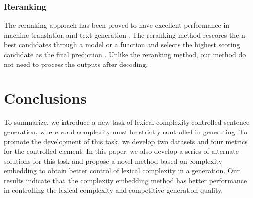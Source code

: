 \documentclass[11pt]{article}
\begin{document}
\subsubsection{Reranking}
The reranking approach has been proved to have excellent performance in machine translation \cite{pandramish2020checkpoint, wang2007reranking} and text generation \cite{ravaut2022summareranker}. The reranking method rescores the n-best candidates through a model or a function and selects the highest scoring candidate as the final prediction \cite{imamura2017ensemble}. Unlike the reranking method, our method do not need to process the outputs after decoding.  

\section{Conclusions}
To summarize, we introduce a new task of lexical complexity controlled sentence generation, where word complexity must be strictly controlled in generating. To promote the development of this task, we develop two datasets and four metrics for the controlled element. In this paper, we also develop a series of alternate solutions for this task and propose a novel method based on complexity embedding to obtain better control of lexical complexity in a generation. Our results indicate that the complexity embedding method has better performance in controlling the lexical complexity and competitive generation quality.

\end{document}
